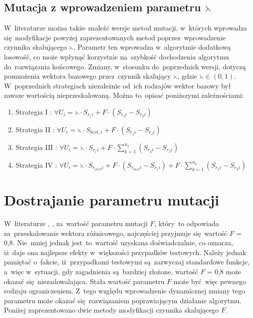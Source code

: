 \subsection{Mutacja z wprowadzeniem parametru $\leftthreetimes$} \label{parametrffunkcja}

W~literaturze \cite{czynnik} można także znaleźć wersje metod mutacji, w~których wprowadza się~modyfikacje powyżej zaprezentowanych metod poprzez~wprowadzenie czynnika skalującego $\leftthreetimes$. Parametr ten wprowadza w~algorytmie dodatkową losowość, co może wpłynąć korzystnie na~szybkość dochodzenia algorytmu do~rozwiązania końcowego. Zmiany, w~stosunku do~poprzednich wersji, dotyczą pomnożenia wektora bazowego przez~czynnik skalujący $\leftthreetimes$, gdzie $\leftthreetimes \in (0,1)$. W~poprzednich strategiach niezależnie od~ich rodzajów wektor bazowy był zawsze wartością nieprzeskalowaną. Można to~opisać poniższymi zależnościami:\\

\begin{enumerate}
\item Strategia I : $ \forall U_{i} = \leftthreetimes \cdot S_{r_{1}i} + F \cdot (S_{r_{2}i} - S_{r_{3}i})$
\item Strategia II : $ \forall U_{i} = \leftthreetimes \cdot  S_{best,i} + F \cdot (S_{r_{1}i} - S_{r_{2}i}) $
\item Strategia III : $ \forall U_{i} = \leftthreetimes \cdot  S_{r_{1}i} +  F \cdot \sum_{k=1}^{n_{v}}(S_{r_{2}i} - S_{r_{3}i}) $
\item Strategia IV : $ \forall U_{i} = \leftthreetimes \cdot S_{r_{itert}i} +  F \cdot (S_{r_{best}i} - S_{r_{1}i}) +  F \cdot \sum_{k=1}^{n_{v}}(S_{r_{2}i} - S_{r_{3}i}) $
\end{enumerate}
\par


\section{Dostrajanie parametru mutacji}\label{rozklad}

W~literaturze \cite{przystojny_koles}, \cite{czynnik}, za~wartość parametru mutacji $F$, który~to odpowiada za~przeskalowanie wektora różnicowego, najczęściej przyjmuje się~wartość $F$ = 0,8. Nie~mniej jednak jest~to~wartość uzyskana doświadczalnie, co oznacza, iż~daje ona najlepsze efekty w~większości przypadków testowych. Należy jednak pamiętać o~fakcie, iż~przypadkami testowymi są~zazwyczaj standardowe funkcje, a~więc w~sytuacji, gdy zagadnienia są~bardziej złożone, wartość $F$ = 0,8 może okazać się~niezadowalająca. Stała wartość parametru $F$ może być~więc pewnego rodzaju ograniczeniem. Z~tego względu wprowadzenie dynamicznej zmiany tego parametru może okazać się~rozwiązaniem poprawiającym działanie algorytmu. Poniżej zaprezentowano dwie metody modyfikacji czynnika skalującego $F$.

